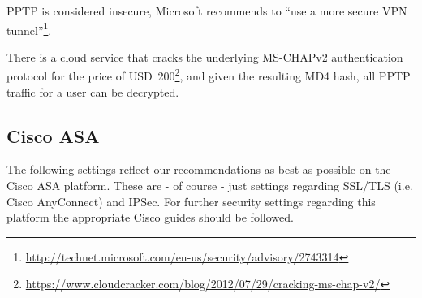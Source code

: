 PPTP is considered insecure, Microsoft recommends to ``use a more secure VPN
tunnel''\footnote{\url{http://technet.microsoft.com/en-us/security/advisory/2743314}}.

There is a cloud service that cracks the underlying MS-CHAPv2
authentication protocol for the price of USD~200\footnote{\url{https://www.cloudcracker.com/blog/2012/07/29/cracking-ms-chap-v2/}},
and given the resulting MD4 hash, all PPTP traffic for a user can
be decrypted.

\subsection{Cisco ASA}
The following settings reflect our recommendations as best as possible on the Cisco ASA platform. These are - of course - just settings regarding SSL/TLS (i.e. Cisco AnyConnect) and IPSec. For further security settings regarding this platform the appropriate Cisco guides should be followed.
